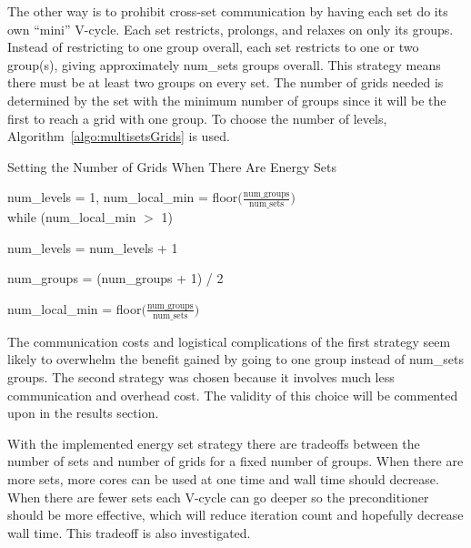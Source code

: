 The other way is to prohibit cross-set communication by having each set do its own ``mini'' V-cycle. Each set restricts, prolongs, and relaxes on only its groups. Instead of restricting to one group overall, each set restricts to one or two group(s), giving approximately num\_sets groups overall. This strategy means there must be at least two groups on every set. The number of grids needed is determined by the set with the minimum number of groups since it will be the first to reach a grid with one group. To choose the number of levels, Algorithm~\ref{algo:multisetsGrids} is used. 
%
\begin{algorithm}
  \caption{ Setting the Number of Grids When There Are Energy Sets}
  \label{algo:multisetsGrids}
   num\_levels = 1, num\_local\_min = floor$\bigl( \frac{\text{num\_groups}}{\text{num\_sets}}\bigr)$ \\
   while (num\_local\_min $>$ 1)
  \begin{list}{}{\hspace{2.5em}}
    \item num\_levels = num\_levels + 1
    \item num\_groups = (num\_groups + 1) / 2
    \item num\_local\_min = floor$\bigl( \frac{\text{num\_groups}}{\text{num\_sets}}\bigr)$
   \end{list}
\end{algorithm}

The communication costs and logistical complications of the first strategy seem likely to overwhelm the benefit gained by going to one group instead of num\_sets groups. The second strategy was chosen because it involves much less communication and overhead cost. The validity of this choice will be commented upon in the results section. 

With the implemented energy set strategy there are tradeoffs between the number of sets and number of grids for a fixed number of groups. When there are more sets, more cores can be used at one time and wall time should decrease. When there are fewer sets each V-cycle can go deeper so the preconditioner should be more effective, which will reduce iteration count and hopefully decrease wall time. This tradeoff is also investigated.

